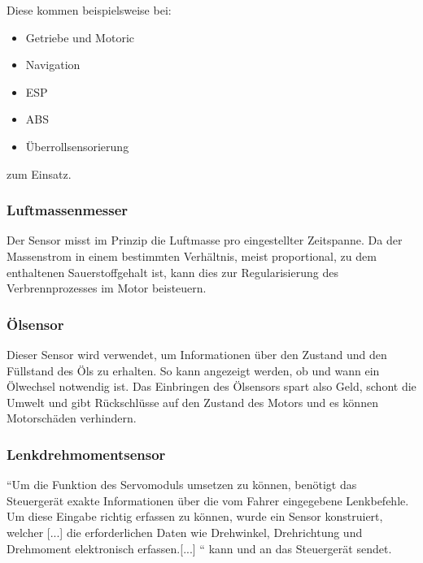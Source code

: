 \begin{flushleft}
					Diese kommen beispielsweise bei:
		           	\begin{itemize}
		           		\item Getriebe und Motoric
		           		\item Navigation
		           		\item ESP
		           		\item ABS
		           		\item Überrollsensorierung
		           	\end{itemize}
					
					zum Einsatz.	          		
	          		
	          
	           \subsubsection{Luftmassenmesser}
	           
	            Der Sensor misst im Prinzip die Luftmasse pro eingestellter Zeitspanne. Da der Massenstrom in einem bestimmten Verhältnis, meist proportional, zu dem enthaltenen Sauerstoffgehalt ist, kann dies zur Regularisierung des Verbrennprozesses im Motor beisteuern.
	           
	            \subsubsection{Ölsensor}
						
	            Dieser Sensor wird verwendet, um Informationen über den Zustand und den Füllstand des Öls zu erhalten. So kann angezeigt werden, ob und wann ein Ölwechsel notwendig ist. 
	            Das Einbringen des Ölsensors spart also Geld, schont die Umwelt und gibt Rückschlüsse auf den Zustand des Motors und es können Motorschäden verhindern.\cite{TS_oel}
	            
	            \subsubsection{Lenkdrehmomentsensor}
	
	            ``Um die Funktion des Servomoduls umsetzen zu können, benötigt das Steuergerät exakte Informationen über die vom Fahrer eingegebene Lenkbefehle. Um diese Eingabe richtig erfassen zu können, wurde ein Sensor konstruiert, welcher [...] die erforderlichen Daten wie Drehwinkel, Drehrichtung und Drehmoment elektronisch erfassen.[...] ``  \cite{TS_dreh} kann und an das Steuergerät sendet.\\
	            

\end{flushleft}
